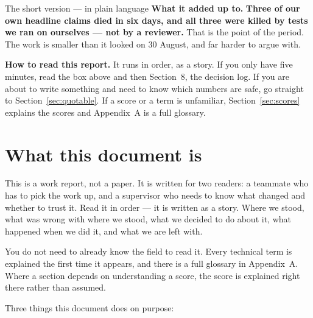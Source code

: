 \documentclass[11pt]{article}
\begin{document}
\begin{keybox}{The short version --- in plain language}
\smallskip
\textbf{What it added up to.} \textbf{Three of our own headline claims died in six days, and all three
were killed by tests we ran on ourselves --- not by a reviewer.} That is the point of the period. The
work is smaller than it looked on 30 August, and far harder to argue with.
\end{keybox}

\vfill
{\footnotesize\color{steel}\noindent\textbf{How to read this report.} It runs in order, as a story.
If you only have five minutes, read the box above and then Section~8, the decision log. If you are
about to write something and need to know which numbers are safe, go straight to
Section~\ref{sec:quotable}. If a score or a term is unfamiliar, Section~\ref{sec:scores} explains the
scores and Appendix~A is a full glossary.}

\newpage
\tableofcontents
\newpage

\section{What this document is}

This is a work report, not a paper. It is written for two readers: a teammate who has to pick the work
up, and a supervisor who needs to know what changed and whether to trust it. Read it in order --- it is
written as a story. Where we stood, what was wrong with where we stood, what we decided to do about it,
what happened when we did it, and what we are left with.

You do not need to already know the field to read it. Every technical term is explained the first time
it appears, and there is a full glossary in Appendix~A. Where a section depends on understanding a
score, the score is explained right there rather than assumed.

Three things this document does on purpose:
\end{document}
